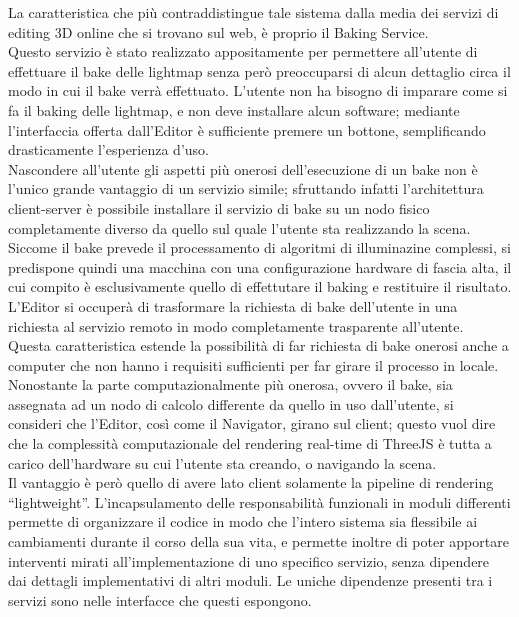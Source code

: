La caratteristica che più contraddistingue tale sistema dalla media dei servizi di editing 3D online che si trovano sul web, è proprio il Baking Service.
\\
Questo servizio è stato realizzato appositamente per permettere all’utente di effettuare il bake delle lightmap senza però preoccuparsi di alcun dettaglio circa il modo in cui il bake verrà effettuato. L’utente non ha bisogno di imparare come si fa il baking delle lightmap, e non deve installare alcun software; mediante l’interfaccia offerta dall’Editor è sufficiente premere un bottone, semplificando drasticamente l’esperienza d’uso. 
\\
Nascondere all’utente gli aspetti più onerosi dell’esecuzione di un bake non è l’unico grande vantaggio di un servizio simile; sfruttando infatti l’architettura client-server è possibile installare il servizio di bake su un nodo fisico completamente diverso da quello sul quale l’utente sta realizzando la scena.
\\ 
Siccome il bake prevede il processamento di algoritmi di illuminazine complessi, si predispone quindi una macchina con una configurazione hardware di fascia alta, il cui compito è esclusivamente quello di effettutare il baking e restituire il risultato. 
\\
L’Editor si occuperà di trasformare la richiesta di bake dell’utente in una richiesta al servizio remoto in modo completamente trasparente all’utente.
\\ 
Questa caratteristica estende la possibilità di far richiesta di bake onerosi anche a computer che non hanno i requisiti sufficienti per far girare il processo in locale. 
\\
Nonostante la parte computazionalmente più onerosa, ovvero il bake, sia assegnata ad un nodo di calcolo differente da quello in uso dall’utente, si consideri che l’Editor, così come il Navigator, girano sul client; questo vuol dire che la complessità computazionale del rendering real-time di ThreeJS è tutta a carico dell’hardware su cui l’utente sta creando, o navigando la scena. 
\\
Il vantaggio è però quello di avere lato client solamente la pipeline di rendering “lightweight”. L’incapsulamento delle responsabilità funzionali in moduli differenti permette di organizzare il codice in modo che l’intero sistema sia flessibile ai cambiamenti durante il corso della sua vita, e permette inoltre di poter apportare interventi mirati all’implementazione di uno specifico servizio, senza dipendere dai dettagli implementativi di altri moduli. Le uniche dipendenze presenti tra i servizi sono nelle interfacce che questi espongono.
